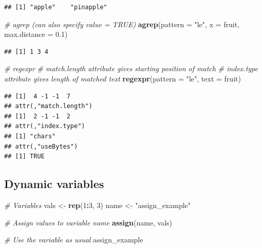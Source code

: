 \documentclass[
  openany]{book}
\newenvironment{Shaded}{\begin{snugshade}}{\end{snugshade}}
\newcommand{\CommentTok}[1]{\textcolor[rgb]{0.56,0.35,0.01}{\textit{#1}}}
\newcommand{\DataTypeTok}[1]{\textcolor[rgb]{0.13,0.29,0.53}{#1}}
\newcommand{\DecValTok}[1]{\textcolor[rgb]{0.00,0.00,0.81}{#1}}
\newcommand{\FloatTok}[1]{\textcolor[rgb]{0.00,0.00,0.81}{#1}}
\newcommand{\KeywordTok}[1]{\textcolor[rgb]{0.13,0.29,0.53}{\textbf{#1}}}
\newcommand{\NormalTok}[1]{#1}
\newcommand{\OperatorTok}[1]{\textcolor[rgb]{0.81,0.36,0.00}{\textbf{#1}}}
\newcommand{\StringTok}[1]{\textcolor[rgb]{0.31,0.60,0.02}{#1}}
\begin{document}
\begin{verbatim}
## [1] "apple"    "pinapple"
\end{verbatim}

\begin{Shaded}
\begin{Highlighting}[]
\CommentTok{# agrep (can also specify value = TRUE)}
\KeywordTok{agrep}\NormalTok{(}\DataTypeTok{pattern =} \StringTok{"le"}\NormalTok{, }\DataTypeTok{x =}\NormalTok{ fruit, }\DataTypeTok{max.distance =} \FloatTok{0.1}\NormalTok{)}
\end{Highlighting}
\end{Shaded}

\begin{verbatim}
## [1] 1 3 4
\end{verbatim}

\begin{Shaded}
\begin{Highlighting}[]
\CommentTok{# regexpr}
\CommentTok{# match.length attribute gives starting position of match}
\CommentTok{# index.type attribute gives length of matched text}
\KeywordTok{regexpr}\NormalTok{(}\DataTypeTok{pattern =} \StringTok{"le"}\NormalTok{, }\DataTypeTok{text =}\NormalTok{ fruit)}
\end{Highlighting}
\end{Shaded}

\begin{verbatim}
## [1]  4 -1 -1  7
## attr(,"match.length")
## [1]  2 -1 -1  2
## attr(,"index.type")
## [1] "chars"
## attr(,"useBytes")
## [1] TRUE
\end{verbatim}

\hypertarget{dynamic-variables}{%
\subsection{Dynamic variables}\label{dynamic-variables}}

\begin{Shaded}
\begin{Highlighting}[]
\CommentTok{# Variables}
\NormalTok{vals <-}\StringTok{ }\KeywordTok{rep}\NormalTok{(}\DecValTok{1}\OperatorTok{:}\DecValTok{3}\NormalTok{, }\DecValTok{3}\NormalTok{)}
\NormalTok{name <-}\StringTok{ "assign_example"}

\CommentTok{# Assign values to variable name}
\KeywordTok{assign}\NormalTok{(name, vals)}

\CommentTok{# Use the variable as usual}
\NormalTok{assign_example}
\end{Highlighting}
\end{Shaded}
\end{document}
